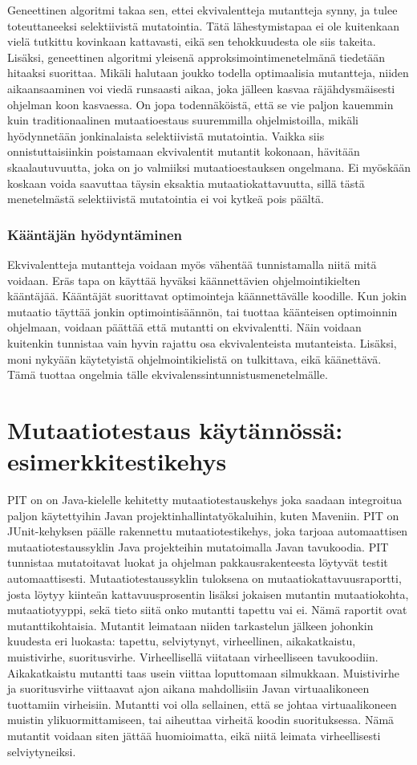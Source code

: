 \documentclass{tktltiki}
\begin{document}
Geneettinen algoritmi takaa sen, ettei ekvivalentteja mutantteja synny, ja tulee toteuttaneeksi selektiivistä mutatointia. Tätä lähestymistapaa ei ole kuitenkaan vielä tutkittu kovinkaan kattavasti, eikä sen tehokkuudesta ole siis takeita. Lisäksi, geneettinen algoritmi yleisenä approksimointimenetelmänä tiedetään hitaaksi suorittaa. Mikäli halutaan joukko todella optimaalisia mutantteja, niiden aikaansaaminen voi viedä runsaasti aikaa, joka jälleen kasvaa räjähdysmäisesti ohjelman koon kasvaessa. On jopa todennäköistä, että se vie paljon kauemmin kuin traditionaalinen mutaatioestaus suuremmilla ohjelmistoilla, mikäli hyödynnetään jonkinalaista selektiivistä mutatointia. Vaikka siis onnistuttaisiinkin poistamaan ekvivalentit mutantit kokonaan, hävitään skaalautuvuutta, joka on jo valmiiksi mutaatioestauksen ongelmana. Ei myöskään koskaan voida saavuttaa täysin eksaktia mutaatiokattavuutta, sillä tästä menetelmästä selektiivistä mutatointia ei voi kytkeä pois päältä.

\subsubsection{Kääntäjän hyödyntäminen}
Ekvivalentteja mutantteja voidaan myös vähentää tunnistamalla niitä mitä voidaan. Eräs tapa on käyttää hyväksi käännettävien ohjelmointikielten kääntäjää. Kääntäjät suorittavat optimointeja käännettävälle koodille. Kun jokin mutaatio täyttää jonkin optimointisäännön, tai tuottaa käänteisen optimoinnin ohjelmaan, voidaan päättää että mutantti on ekvivalentti. Näin voidaan kuitenkin tunnistaa vain hyvin rajattu osa ekvivalenteista mutanteista. Lisäksi, moni nykyään käytetyistä ohjelmointikielistä on tulkittava, eikä käänettävä. Tämä tuottaa ongelmia tälle ekvivalenssintunnistusmenetelmälle. 

\section{Mutaatiotestaus käytännössä: esimerkkitestikehys}
PIT on on Java-kielelle kehitetty mutaatiotestauskehys joka saadaan integroitua paljon käytettyihin Javan projektinhallintatyökaluihin, kuten Maveniin. PIT on JUnit-kehyksen päälle rakennettu mutaatiotestikehys, joka tarjoaa automaattisen mutaatiotestaussyklin Java projekteihin mutatoimalla Javan tavukoodia. PIT tunnistaa mutatoitavat luokat ja ohjelman pakkausrakenteesta löytyvät testit automaattisesti. Mutaatiotestaussyklin tuloksena on mutaatiokattavuusraportti, josta löytyy kiinteän kattavuusprosentin lisäksi jokaisen mutantin mutaatiokohta, mutaatiotyyppi, sekä tieto siitä onko mutantti tapettu vai ei. Nämä raportit ovat mutanttikohtaisia. Mutantit leimataan niiden tarkastelun jälkeen johonkin kuudesta eri luokasta: tapettu, selviytynyt, virheellinen, aikakatkaistu, muistivirhe, suoritusvirhe. Virheellisellä viitataan virheelliseen tavukoodiin. Aikakatkaistu mutantti taas usein viittaa loputtomaan silmukkaan. Muistivirhe ja suoritusvirhe viittaavat ajon aikana mahdollisiin Javan virtuaalikoneen tuottamiin virheisiin. Mutantti voi olla sellainen, että se johtaa virtuaalikoneen muistin ylikuormittamiseen, tai aiheuttaa virheitä koodin suorituksessa. Nämä mutantit voidaan siten jättää huomioimatta, eikä niitä leimata virheellisesti selviytyneiksi.
\end{document}
